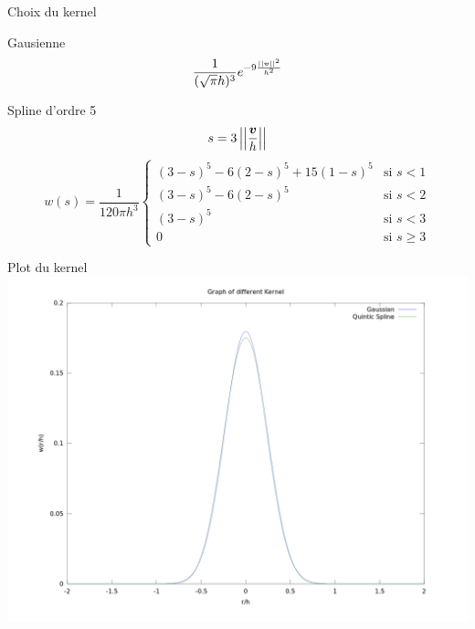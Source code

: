 \begin{frame}[<+->]{Choix du kernel}
\begin{block}{Gausienne}
\begin{equation*}
 \frac{1}{(\sqrt{\pi} h)^3}e^{-9\frac{||{\boldsymbol {v}}||^2}{h^2}}
\end{equation*}
\end{block}

\begin{block}{Spline d'ordre 5}
\begin{equation*}
     s=3\left|\left|\frac{{\boldsymbol {v}}}{h}\right|\right|
\end{equation*}
\small
\begin{equation*}
     w(s)=\frac{1}{120\pi h^3} \begin{cases} (3-s)^5-6(2-s)^5+15(1-s)^5 & \text{si $s<1$}\\
   (3-s)^5-6(2-s)^5& \text{si $s<2$}\\
   (3-s)^5& \text{si $s<3$}\\
   0& \text{si $s\geq 3$} \end{cases}
   \end{equation*}
\end{block}
\end{frame}
\begin{frame}{Plot du kernel}
 \includegraphics[width=\textwidth]{kernel.png}
\end{frame}


